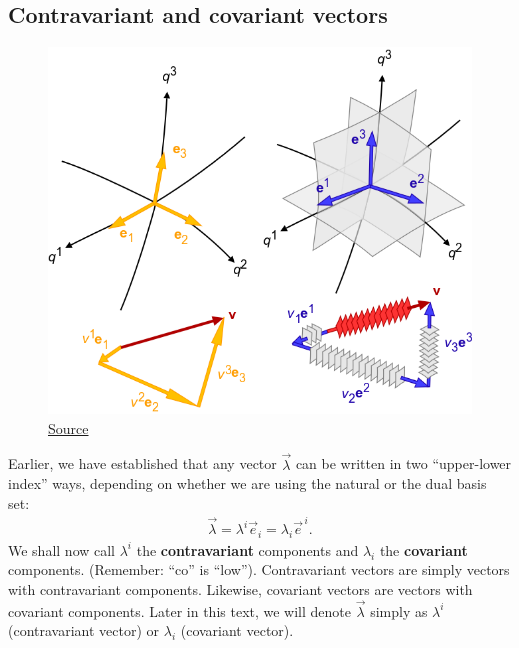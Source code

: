 \documentclass{book}
\theoremstyle{definition}
\begin{document}
\subsection{Contravariant and covariant vectors}
\begin{figure}[h!]
	\centering
	\includegraphics[scale=0.3]{gr-fig-add1.png}
	\caption*{\href{https://en.wikipedia.org/wiki/Covariance_and_contravariance_of_vectors}{Source}}
\end{figure}
Earlier, we have established that any vector $\vec{\lambda}$ can be written in two ``upper-lower index'' ways, depending on whether we are using the natural or the dual basis set:
\begin{align*}
\vec{\lambda} = \lambda^i\vec{e}_i = \lambda_i\vec{e}^{\,i}.
\end{align*}
We shall now call $\lambda^i$ the \textbf{contravariant} components and $\lambda_i$ the \textbf{covariant} components. (Remember: ``co'' is ``low''). Contravariant vectors are simply vectors with contravariant components. Likewise, covariant vectors are vectors with covariant components. Later in this text, we will denote $\vec{\lambda}$ simply as $\lambda^i$ (contravariant vector) or $\lambda_i$ (covariant vector).\\
\end{document}
